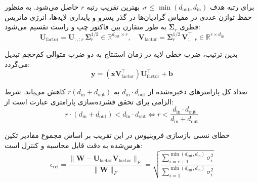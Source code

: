 برای رتبه هدف $r \le \min(d_{\text{out}}, d_{\text{in}})$، بهترین تقریب رتبه $r$ حاصل می‌شود. به منظور حفظ توازن عددی در مقیاس گرادیان‌ها در گذر پسرو و پایداری لایه‌ها، انرژی ماتریس قطری $\mathbf{\Sigma}_r$ به طور متقارن بین فاکتور چپ و راست تقسیم می‌شود:
\begin{equation}
\mathbf{U}_{\text{factor}} = \mathbf{U}_{:, :r} \, \mathbf{\Sigma}_r^{1/2} \in \mathbb{R}^{d_{\text{out}} \times r}, \quad \mathbf{V}_{\text{factor}} = \mathbf{\Sigma}_r^{1/2} \, \mathbf{V}_{:, :r}^\top \in \mathbb{R}^{r \times d_{\text{in}}}
\end{equation}

بدین ترتیب، ضرب خطی لایه در زمان استنتاج به دو ضرب متوالی کم‌حجم تبدیل می‌گردد:
\begin{equation}
\mathbf{y} = (\mathbf{x} \mathbf{V}_{\text{factor}}^\top) \mathbf{U}_{\text{factor}}^\top + \mathbf{b}
\end{equation}

تعداد کل پارامترهای ذخیره‌شده از $d_{\text{in}} \cdot d_{\text{out}}$ به $r(d_{\text{in}} + d_{\text{out}})$ کاهش می‌یابد. شرط الزامی برای تحقق فشرده‌سازی پارامتری عبارت است از:
\begin{equation}
r \cdot (d_{\text{in}} + d_{\text{out}}) < d_{\text{in}} \cdot d_{\text{out}} \iff r < \frac{d_{\text{in}} \cdot d_{\text{out}}}{d_{\text{in}} + d_{\text{out}}}
\end{equation}

خطای نسبی بازسازی فروبنیوس در این تقریب بر اساس مجموع مقادیر تکین هرس‌شده به دقت قابل محاسبه و کنترل است:
\begin{equation}
\epsilon_{\text{rel}} = \frac{\|\mathbf{W} - \mathbf{U}_{\text{factor}} \mathbf{V}_{\text{factor}}\|_F}{\|\mathbf{W}\|_F} = \sqrt{\frac{\sum_{i=r+1}^{\min(d_{\text{out}}, d_{\text{in}})} \sigma_i^2}{\sum_{i=1}^{\min(d_{\text{out}}, d_{\text{in}})} \sigma_i^2}}
\end{equation}

